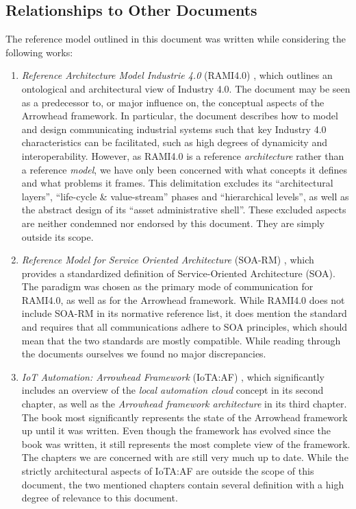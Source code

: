 \subsection{Relationships to Other Documents}
\label{sec:introduction:relationships}

The reference model outlined in this document was written while considering the following works:

\begin{enumerate}
\item \textit{Reference Architecture Model Industrie 4.0} (RAMI4.0) \cite{adolphs2016reference}, which outlines an ontological and architectural view of Industry 4.0.
The document may be seen as a predecessor to, or major influence on, the conceptual aspects of the Arrowhead framework.
In particular, the document describes how to model and design communicating industrial systems such that key Industry 4.0 characteristics can be facilitated, such as high degrees of dynamicity and interoperability.
However, as RAMI4.0 is a reference \textit{architecture} rather than a reference \textit{model}, we have only been concerned with what concepts it defines and what problems it frames.
This delimitation excludes its ``architectural layers'', ``life-cycle \& value-stream'' phases and ``hierarchical levels'', as well as the abstract design of its ``asset administrative shell''.
These excluded aspects are neither condemned nor endorsed by this document.
They are simply outside its scope.

\item \textit{Reference Model for Service Oriented Architecture} (SOA-RM) \cite{mackenzie2006reference}, which provides a standardized definition of Service-Oriented Architecture (SOA).
The paradigm was chosen as the primary mode of communication for RAMI4.0, as well as for the Arrowhead framework.
While RAMI4.0 does not include SOA-RM in its normative reference list, it does mention the standard and requires that all communications adhere to SOA principles, which should mean that the two standards are mostly compatible.
While reading through the documents ourselves we found no major discrepancies.

\item \textit{IoT Automation: Arrowhead Framework} (IoTA:AF) \cite{delsing2017iot}, which significantly includes an overview of the \textit{local automation cloud} concept in its second chapter, as well as the \textit{Arrowhead framework architecture} in its third chapter.
The book most significantly represents the state of the Arrowhead framework up until it was written.
Even though the framework has evolved since the book was written, it still represents the most complete view of the framework.
The chapters we are concerned with are still very much up to date.
While the strictly architectural aspects of IoTA:AF are outside the scope of this document, the two mentioned chapters contain several definition with a high degree of relevance to this document.

\end{enumerate}

